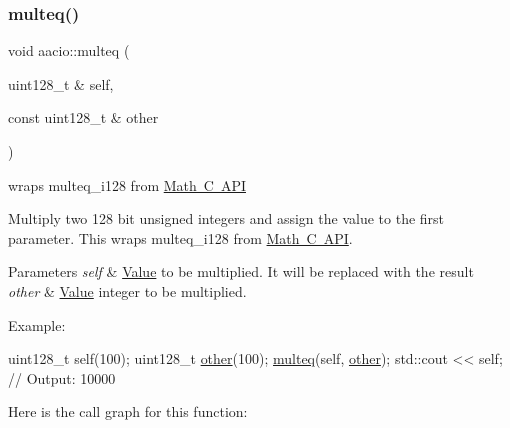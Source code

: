 \subsubsection{\texorpdfstring{multeq()}{multeq()}}
{\footnotesize\ttfamily void aacio\+::multeq (\begin{DoxyParamCaption}\item[{uint128\+\_\+t \&}]{self,  }\item[{const uint128\+\_\+t \&}]{other }\end{DoxyParamCaption})\hspace{0.3cm}{\ttfamily [inline]}}



wraps multeq\+\_\+i128 from \mbox{\hyperlink{group__mathcapi}{Math C A\+PI}} 

Multiply two 128 bit unsigned integers and assign the value to the first parameter. This wraps multeq\+\_\+i128 from \mbox{\hyperlink{group__mathcapi}{Math C A\+PI}}. 
\begin{DoxyParams}{Parameters}
{\em self} & \mbox{\hyperlink{struct_value}{Value}} to be multiplied. It will be replaced with the result \\
\hline
{\em other} & \mbox{\hyperlink{struct_value}{Value}} integer to be multiplied.\\
\hline
\end{DoxyParams}
Example\+: 
\begin{DoxyCode}
uint128\_t \textcolor{keyword}{self}(100);
uint128\_t \mbox{\hyperlink{structother}{other}}(100);
\mbox{\hyperlink{group__mathcppapi_gac2619557a323e4fdb5f2b69a345573e2}{multeq}}(\textcolor{keyword}{self}, \mbox{\hyperlink{structother}{other}});
std::cout << \textcolor{keyword}{self}; \textcolor{comment}{// Output: 10000}
\end{DoxyCode}
 Here is the call graph for this function\+:
